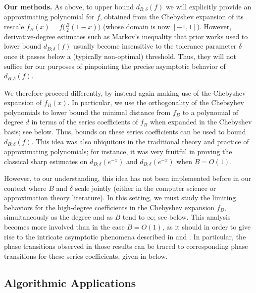  \textbf{Our methods.} As above, to upper bound $d_{B; \delta} (f)$ we will explicitly provide an approximating polynomial for $f$, obtained from the Chebyshev expansion of its rescale $f_B (x) = f \big( \frac{B}{2} (1 - x) \big)$ (whose domain is now $[-1, 1]$). However, derivative-degree estimates such as Markov's inequality that prior works used to lower bound $d_{B; \delta} (f)$ usually become insensitive to the tolerance parameter $\delta$ once it passes below a (typically non-optimal) threshold. Thus, they will not suffice for our purposes of pinpointing the precise asymptotic behavior of $d_{B; \delta} (f)$.

We therefore proceed differently, by instead again making use of the Chebyshev expansion of $f_B (x)$. In particular, we use the orthogonality of the Chebsyhev polynomials to lower bound the minimal distance from $f_B$ to a polynomial of degree $d$ in terms of the series coefficients of $f_B$ when expanded in the Chebyshev basis; see  below. Thus, bounds on these series coefficients can be used to bound $d_{B; \delta} (f)$. This idea was also ubiquitous in the traditional theory and practice of approximating polynomials; for instance, it was very fruitful in proving the classical sharp estimates \cite[{Chapter 7.8 (22)}]{TAFRV} on $d_{B; \delta} (e^{-x})$ and $d_{B; \delta} (e^{-x})$ when $B = O(1)$. 

However, to our understanding, this idea has not been implemented before in our context where $B$ and $\delta$ scale jointly (either in the computer science or approximation theory literature). In this setting, we must study the limiting behaviors for the high-degree coefficients in the Chebyshev expansion $f_B$, simultaneously as the degree and as $B$ tend to $\infty$; see  below. This analysis becomes more involved than in the case $B = O(1)$, as it should in order to give rise to the intricate asymptotic phenomena described in  and . In particular, the phase transitions observed in those results can be traced to corresponding phase transitions for these series coefficients, given in  below. 



\subsection{Algorithmic Applications}

\label{Algorithm}

